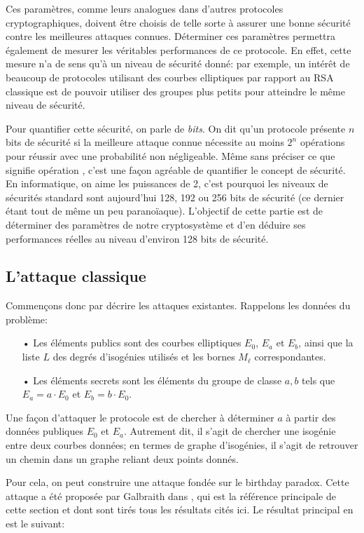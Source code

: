 \documentclass[11pt,a4paper]{article}
\renewcommand{\v}{\vspace{5mm}}
\theoremstyle{definition}
\begin{document}
Ces paramètres, comme leurs analogues dans d'autres protocoles cryptographiques, doivent être choisis de telle sorte à assurer une bonne sécurité contre les meilleures attaques connues. Déterminer ces paramètres permettra également de mesurer les véritables performances de ce protocole. En effet, cette mesure n'a de sens qu'à un niveau de sécurité donné: par exemple, un intérêt de beaucoup de protocoles utilisant des courbes elliptiques par rapport au RSA classique est de pouvoir utiliser des groupes plus petits pour atteindre le même niveau de sécurité.

\v
Pour quantifier cette sécurité, on parle de \emph{bits}. On dit qu'un protocole présente $n$ bits de sécurité si la meilleure attaque connue nécessite au moins $2^n$ opérations pour réussir avec une probabilité non négligeable. Même sans préciser ce que signifie \og opération \fg, c'est une façon agréable de quantifier le concept de sécurité. En informatique, on aime les puissances de 2, c'est pourquoi les niveaux de sécurités standard sont aujourd'hui 128, 192 ou 256 bits de sécurité (ce dernier étant tout de même un peu paranoïaque). L'objectif de cette partie est de déterminer des paramètres de notre cryptosystème et d'en déduire ses performances réelles au niveau d'environ 128 bits de sécurité.


\subsection{L'attaque classique}


Commençons donc par décrire les attaques existantes. Rappelons les données du problème:
\begin{itemize}
\item[•] Les éléments publics sont des courbes elliptiques $E_0$, $E_a$ et $E_b$, ainsi que la liste $L$ des degrés d'isogénies utilisés et les bornes $M_\ell$ correspondantes.
\item[•] Les éléments secrets sont les éléments du groupe de classe $a, b$ tels que $E_a = a\cdot E_0$ et $E_b = b\cdot E_0$.
\end{itemize}

Une façon d'attaquer le protocole est de chercher à déterminer $a$ à partir des données publiques $E_0$ et $E_a$. Autrement dit, il s'agit de chercher une isogénie entre deux courbes données; en termes de graphe d'isogénies, il s'agit de retrouver un chemin dans un graphe reliant deux points donnés.

\v
Pour cela, on peut construire une attaque fondée sur le \og birthday paradox\fg. Cette attaque a été proposée par Galbraith dans \cite{Galbraith}, qui est la référence principale de cette section et dont sont tirés tous les résultats cités ici. Le résultat principal en est le suivant:
\end{document}
